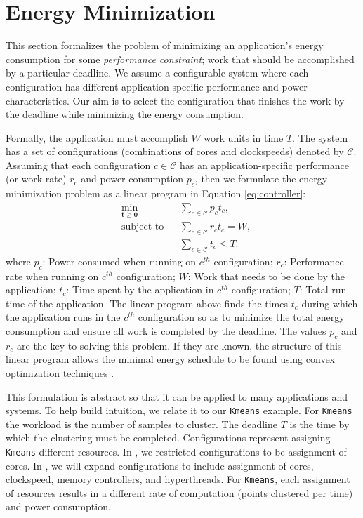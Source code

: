 \section{Energy Minimization}
\label{sec:problemFormulation}

This section formalizes the problem of minimizing an application's
energy consumption for some \emph{performance constraint}; \ie work
that should be accomplished by a particular deadline.  We assume a
configurable system where each configuration has different
application-specific performance and power characteristics. Our aim is
to select the configuration that finishes the work by the deadline
while minimizing the energy consumption.

Formally, the application must accomplish $W$ work units in time $T$.
The system has a set of configurations (\eg combinations of cores and
clockspeeds) denoted by $\mathcal{C}$. Assuming that each
configuration $c \in \mathcal{C}$ has an application-specific
performance (or work rate) $r_c$ and power consumption $p_c$, then we
formulate the energy minimization problem as a linear program in
Equation \eqref{eq:controller}:
\begin{equation}
\begin{aligned}
&   \underset{\mathbf{t} \geq \mathbf{0}}{\text{min}}
&&   \sum_{c \in \mathcal{C}} p_c t_c, \\
&   \text{subject to} &&  \sum_{c \in \mathcal{C}} r_c t_c = W, \\
&&&	 \sum_{c \in \mathcal{C}} t_c \leq T.
\end{aligned}
\label{eq:controller}
\end{equation}
where $p_c$: Power consumed when running on $c^{th}$ configuration;
$r_c$: Performance rate when running on $c^{th}$ configuration; $W$:
Work that needs to be done by the application; $t_c$: Time spent by
the application in $c^{th}$ configuration; $T$: Total run time of the
application. The linear program above finds the times $t_c$ during
which the application runs in the $c^{th}$ configuration so as to
minimize the total energy consumption and ensure all work is completed
by the deadline.  The values $p_c$ and $r_c$ are the key to solving
this problem.  If they are known, the structure of this linear program
allows the minimal energy schedule to be found using convex
optimization techniques \cite{LinearProgramming}.

This formulation is abstract so that it can be applied to many
applications and systems.  To help build intuition, we relate it to
our \texttt{Kmeans} example.  For \texttt{Kmeans} the workload is the
number of samples to cluster.  The deadline $T$ is the time by which
the clustering must be completed.  Configurations represent assigning
\texttt{Kmeans} different resources.  In , we
restricted configurations to be assignment of cores.  In
, we will expand configurations to include
assignment of cores, clockspeed, memory controllers, and hyperthreads.
For \texttt{Kmeans}, each assignment of resources results in a
different rate of computation (points clustered per time) and power
consumption.

